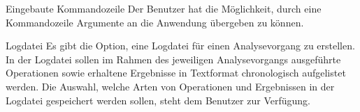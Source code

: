  Eingebaute Kommandozeile
\newline
Der Benutzer hat die Möglichkeit, durch eine Kommandozeile Argumente an die Anwendung übergeben zu können.

 Logdatei
\newline
Es gibt die Option, eine Logdatei für einen Analysevorgang zu erstellen. In der Logdatei sollen im Rahmen
 des jeweiligen Analysevorgangs ausgeführte Operationen sowie erhaltene Ergebnisse in Textformat
  chronologisch aufgelistet werden. Die Auswahl, welche Arten von Operationen und Ergebnissen in der
   Logdatei gespeichert werden sollen, steht dem Benutzer zur Verfügung.
